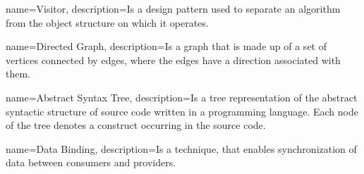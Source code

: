 

\makeglossaries

{
    name=Visitor,
    description={Is a design pattern used to separate an algorithm from the object structure on which it operates.}
}

{
    name=Directed Graph,
    description={Is a graph that is made up of a set of vertices connected by edges, where the edges have a direction associated with them.}
}


{
    name=Abstract Syntax Tree,
    description={Is a tree representation of the abstract syntactic structure of source code written in a programming language. Each node of the tree denotes a construct occurring in the source code.}
}


{
    name=Data Binding,
    description={Is a technique, that enables synchronization of data between consumers and providers.}
}










